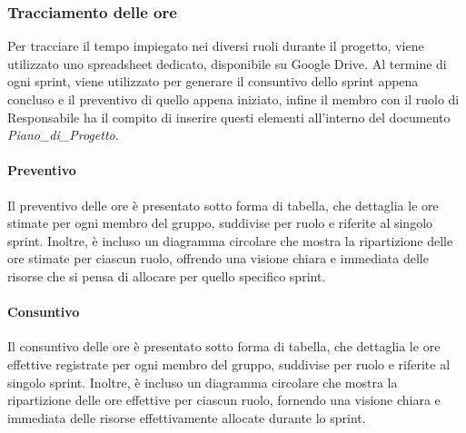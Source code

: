 \documentclass[10pt]{article}
\begin{document}
\begin{justify}
    \subsubsection{Tracciamento delle ore}
    Per tracciare il tempo impiegato nei diversi ruoli durante il progetto, viene utilizzato uno spreadsheet dedicato, disponibile su Google Drive. Al termine di ogni sprint, viene utilizzato per generare il consuntivo dello sprint appena concluso e il preventivo di quello appena iniziato, infine il membro con il ruolo di Responsabile ha il compito di inserire questi elementi all'interno del documento \textit{Piano\_di\_Progetto}.

        \paragraph{Preventivo}
        Il preventivo delle ore è presentato sotto forma di tabella, che dettaglia le ore stimate per ogni membro del gruppo, suddivise per ruolo e riferite al singolo sprint. Inoltre, è incluso un diagramma circolare che mostra la ripartizione delle ore stimate per ciascun ruolo, offrendo una visione chiara e immediata delle risorse che si pensa di allocare per quello specifico sprint.

        \paragraph{Consuntivo}
        Il consuntivo delle ore è presentato sotto forma di tabella, che dettaglia le ore effettive registrate per ogni membro del gruppo, suddivise per ruolo e riferite al singolo sprint. Inoltre, è incluso un diagramma circolare che mostra la ripartizione delle ore effettive per ciascun ruolo, fornendo una visione chiara e immediata delle risorse effettivamente allocate durante lo sprint.


\end{justify}
\end{document}
